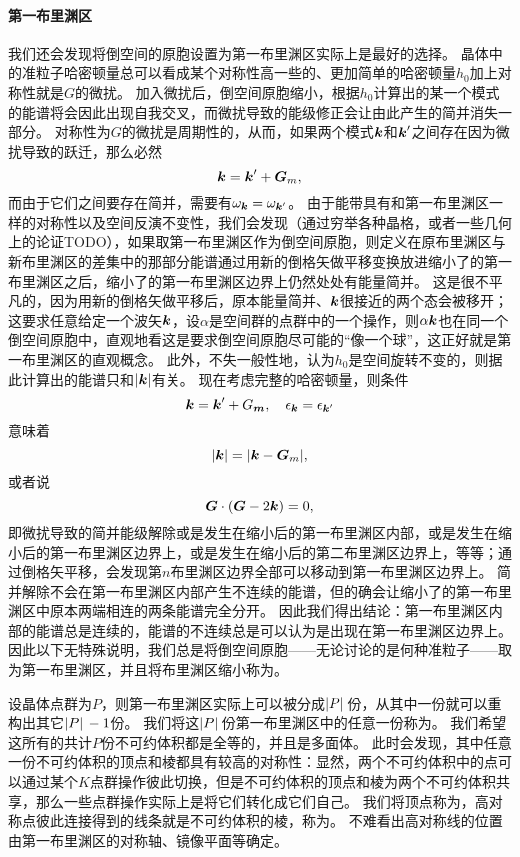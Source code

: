 \paragraph{第一布里渊区} 我们还会发现将倒空间的原胞设置为第一布里渊区实际上是最好的选择。
晶体中的准粒子哈密顿量总可以看成某个对称性高一些的、更加简单的哈密顿量$h_0$加上对称性就是$G$的微扰。
加入微扰后，倒空间原胞缩小，根据$h_0$计算出的某一个模式的能谱将会因此出现自我交叉，而微扰导致的能级修正会让由此产生的简并消失一部分。
对称性为$G$的微扰是周期性的，从而，如果两个模式$\vb*{k}$和$\vb*{k}'$之间存在因为微扰导致的跃迁，那么必然
\[
    \vb*{k} = \vb*{k}' + \vb*{G}_m,
\]
而由于它们之间要存在简并，需要有$\omega_{\vb*{k}} = \omega_{\vb*{k}'}$。
由于能带具有和第一布里渊区一样的对称性以及空间反演不变性，我们会发现（通过穷举各种晶格，或者一些几何上的论证TODO），如果取第一布里渊区作为倒空间原胞，则定义在原布里渊区与新布里渊区的差集中的那部分能谱通过用新的倒格矢做平移变换放进缩小了的第一布里渊区之后，缩小了的第一布里渊区边界上仍然处处有能量简并。
这是很不平凡的，因为用新的倒格矢做平移后，原本能量简并、$\vb*{k}$很接近的两个态会被移开；这要求任意给定一个波矢$\vb*{k}$，设$\alpha$是空间群的点群中的一个操作，则$\alpha \vb*{k}$也在同一个倒空间原胞中，直观地看这是要求倒空间原胞尽可能的“像一个球”，这正好就是第一布里渊区的直观概念。
此外，不失一般性地，认为$h_0$是空间旋转不变的，则据此计算出的能谱只和$\abs{\vb*{k}}$有关。
现在考虑完整的哈密顿量，则条件
\[
    \vb*{k} = \vb*{k}' + G_{\vb*{m}}, \quad \epsilon_{\vb*{k}} = \epsilon_{\vb*{k}'}
\]
意味着
\[
    \abs{\vb*{k}} = \abs{\vb*{k} - \vb*{G}_m},
\]
或者说
\[
    \vb*{G} \cdot (\vb*{G} - 2 \vb*{k}) = 0,
\]
即微扰导致的简并能级解除或是发生在缩小后的第一布里渊区内部，或是发生在缩小后的第一布里渊区边界上，或是发生在缩小后的第二布里渊区边界上，等等；通过倒格矢平移，会发现第$n$布里渊区边界全部可以移动到第一布里渊区边界上。
简并解除不会在第一布里渊区内部产生不连续的能谱，但的确会让缩小了的第一布里渊区中原本两端相连的两条能谱完全分开。
因此我们得出结论：第一布里渊区内部的能谱总是连续的，能谱的不连续总是可以认为是出现在第一布里渊区边界上。
因此以下无特殊说明，我们总是将倒空间原胞——无论讨论的是何种准粒子——取为第一布里渊区，并且将布里渊区缩小称为。

设晶体点群为$P$，则第一布里渊区实际上可以被分成$\abs*{P}$份，从其中一份就可以重构出其它$\abs*{P} - 1$份。
我们将这$\abs*{P}$份第一布里渊区中的任意一份称为。
我们希望这所有的共计$P$份不可约体积都是全等的，并且是多面体。
此时会发现，其中任意一份不可约体积的顶点和棱都具有较高的对称性：显然，两个不可约体积中的点可以通过某个$K$点群操作彼此切换，但是不可约体积的顶点和棱为两个不可约体积共享，那么一些点群操作实际上是将它们转化成它们自己。
我们将顶点称为，高对称点彼此连接得到的线条就是不可约体积的棱，称为。
不难看出高对称线的位置由第一布里渊区的对称轴、镜像平面等确定。

